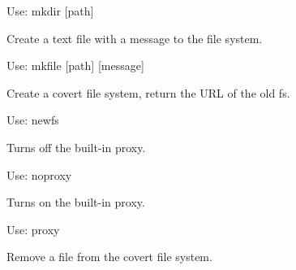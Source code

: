 \documentclass[letterpaper,12pt,openany,oneside]{sphinxmanual}
\begin{document}
\begin{fulllineitems}
\begin{fulllineitems}
Use: mkdir {[}path{]}

\end{fulllineitems}


\begin{fulllineitems}
\label{main:main.Console.do_mkfile}
Create a text file with a message to the file system.

Use: mkfile {[}path{]} {[}message{]}

\end{fulllineitems}


\begin{fulllineitems}
\label{main:main.Console.do_mount}
\end{fulllineitems}


\begin{fulllineitems}
\label{main:main.Console.do_newfs}
Create a covert file system, return the URL of the old fs.

Use: newfs

\end{fulllineitems}


\begin{fulllineitems}
\label{main:main.Console.do_noproxy}
Turns off the built-in proxy.

Use: noproxy

\end{fulllineitems}


\begin{fulllineitems}
\label{main:main.Console.do_proxy}
Turns on the built-in proxy.

Use: proxy

\end{fulllineitems}


\begin{fulllineitems}
\label{main:main.Console.do_rm}
Remove a file from the covert file system.


\end{fulllineitems}
\end{fulllineitems}
\end{document}
